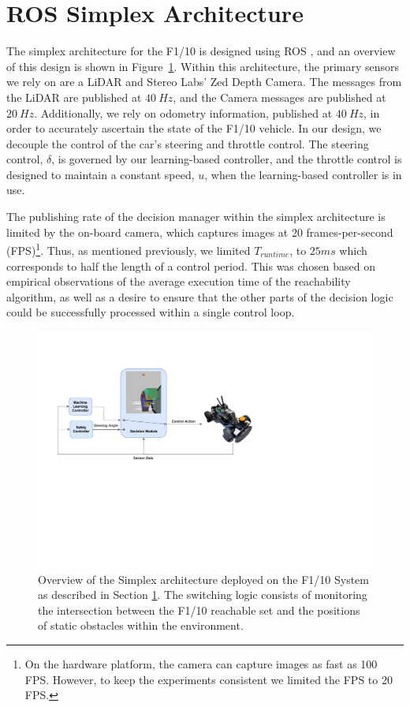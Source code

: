 \documentclass[manuscript,screen,review]{acmart}
\begin{document}
\section{ROS Simplex Architecture}



\label{section:simplex}
The simplex architecture for the F1/10 is designed using ROS \cite{ROS}, and an overview of this design is shown in Figure~\ref{fig:simplex_arch}. Within this architecture, the primary sensors we rely on are a LiDAR and Stereo Labs' Zed Depth Camera. The messages from the LiDAR are published at $40 \ Hz$, and the Camera messages are published at $20 \ Hz$. Additionally, we rely on odometry information, published at $40 \ Hz$, in order to accurately ascertain the state of the F1/10 vehicle. In our design, we decouple the control of the car's steering and throttle control. The steering control, $\delta$, is governed by our learning-based controller, and the throttle control is designed to maintain a constant speed, $u$, when the learning-based controller is in use. 

The publishing rate of the decision manager within the simplex architecture is limited by the on-board camera, which captures images at 20 frames-per-second (FPS)\footnote{On the hardware platform, the camera can capture images as fast as 100 FPS. However, to keep the experiments consistent we limited the FPS to 20 FPS.}. Thus, as mentioned previously, we limited $T_{runtime}$, to $25 ms$ which corresponds to half the length of a control period. This was chosen based on empirical observations of the average execution time of the reachability algorithm, as well as a desire to ensure that the other parts of the decision logic could be successfully processed within a single control loop.

\begin{figure}[htbp]%
  \centering
  \includegraphics[width=0.7\linewidth]{figures/simplex_simple_v2.pdf}
  \caption{Overview of the Simplex architecture deployed on the F1/10 System as described in Section \ref{section:simplex}. The switching logic consists of monitoring the intersection between the F1/10 reachable set and the positions of static obstacles within the environment.}
  \label{fig:simplex_arch}
\end{figure}%
\end{document}
